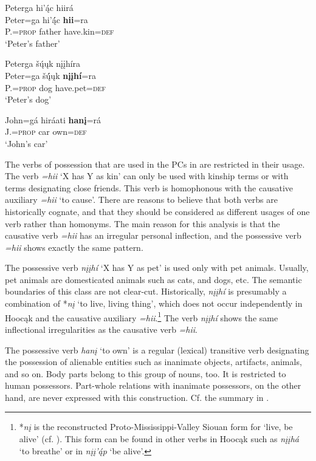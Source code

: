 \documentclass[output=paper]{LSP/langsci}
\begin{document}
\ea 
\glll Peterga hi'ą́c hiirá \\
Peter=ga        hi’ą́́c   \textbf{hii}=ra \\
P.=\textsc{prop}  father have.kin=\textsc{def} \\
\glt `Peter's father'

\ex 
\glll Peterga šų́ųk nįįhíra \\
Peter=ga      šų́́ųk   \textbf{nįįhí}=ra \\
P.=\textsc{prop} dog   have.pet=\textsc{def} \\
\glt `Peter's dog'

\ex \gll John=gá      hiráati \textbf{hanį}=rá \\
J.=\textsc{prop} car       own=\textsc{def} \\
\glt `John's car'

\z \z

The verbs of possession that are used in the PCs in  are restricted in their usage. The verb \textit{=hii} `X has Y as kin' can only be used with kinship terms or with terms designating close friends. This verb is homophonous with the causative auxiliary \textit{=hii} `to cause'. There are reasons to believe that both verbs are historically cognate, and that they should be considered as different usages of one verb rather than homonyms. The main reason for this analysis is that the causative verb \textit{=hii} has an irregular personal inflection, and the possessive verb \textit{=hii} shows exactly the same pattern. 

The possessive verb \textit{nįįh\'i} `X has Y as pet' is used only with pet animals. Usually, pet animals are domesticated animals such as cats, and dogs, etc. The semantic boundaries of this class are not clear-cut. Historically, \textit{nįįhí} is presumably a combination of *\textit{nį} `to live, living thing', which does not occur independently in Hoocąk and the causative auxiliary \textit{=hii}.\footnote{*\textit{n\k{i}} is the reconstructed Proto-Mississippi-Valley Siouan form for `live, be alive' (cf. \citealt{RankinEtAl2015AccessMay}). This form can be found in other verbs in Hoocąk such as \textit{n\k{i}\k{i}h\'a} `to breathe'  or in \textit{n\k{i}\k{i}'\'{\k{a}}p} `be alive'.} The verb \textit{nįįhí} shows the same inflectional irregularities as the causative verb \textit{=hii}. 

The possessive verb \textit{han\k{i}} `to own' is a regular (lexical) transitive verb designating the possession of alienable entities such as inanimate objects, artifacts, animals, and so on. Body parts belong to this group of nouns, too. It is restricted to human possessors. Part-whole relations with inanimate possessors, on the other hand, are never expressed with this construction. Cf. the summary in .
\end{document}
